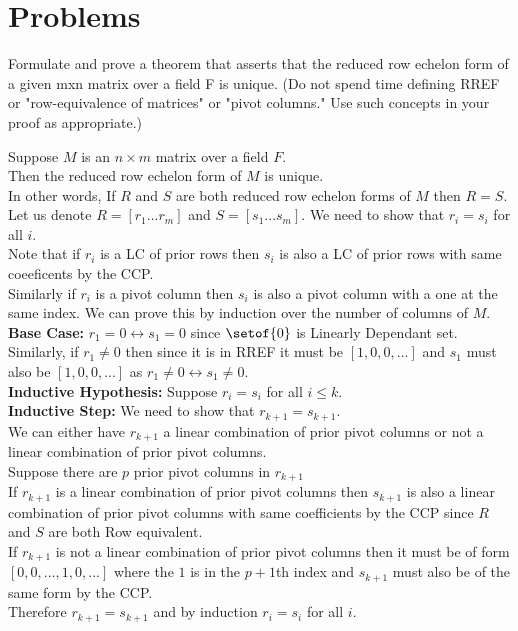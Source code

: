 \documentclass[answers,12pt,addpoints]{exam}
\begin{document}
\section*{Problems}
\begin{questions}
    \question Formulate and prove a theorem that asserts that the reduced row
    echelon form of a given mxn matrix over a field F is unique.  (Do not
    spend time defining RREF or "row-equivalence of matrices" or "pivot
    columns."  Use such concepts in your proof as appropriate.)\\
    \begin{solution}
        Suppose $M$ is an $n \times m$ matrix over a field $F$.\\
        Then the reduced row echelon form of $M$ is unique.\\
        In other words, If $R$ and $S$ are both reduced row echelon forms of $M$ then $R = S$.\\
        Let us denote $R = [r_1 ... r_m]$ and $S = [s_1 ... s_m]$. We need to show that $r_i = s_i$ for all $i$.\\
        Note that if $r_i$ is a LC of prior rows then $s_i$ is also a LC of prior rows with same coeeficents by the CCP.\\
        Similarly if $r_i$ is a pivot column then $s_i$ is also a pivot column with a one at the same index. 
        We can prove this by induction over the number of columns of $M$.\\
        \textbf{Base Case:} $r_1 = 0 \leftrightarrow s_1 = 0$ since $\setof{0}$ is Linearly Dependant set. Similarly, if $r_1 \neq 0$ then since it is in RREF it must be $[1,0,0,...]$ and $s_1$ must also be $[1,0,0,...]$ as $r_1 \neq 0 \leftrightarrow s_1 \neq 0$.\\
        \textbf{Inductive Hypothesis:} Suppose $r_i = s_i$ for all $i \leq k$.\\
        \textbf{Inductive Step:} We need to show that $r_{k+1} = s_{k+1}$.\\
        We can either have $r_{k+1}$ a linear combination of prior pivot columns or not a linear combination of prior pivot columns.\\
        Suppose there are $p$ prior pivot columns in $r_{k+1}$ \\
        If $r_{k+1}$ is a linear combination of prior pivot columns then $s_{k+1}$ is also a linear combination of prior pivot columns with same coefficients by the CCP since $R$ and $S$ are both Row equivalent. \\
        If $r_{k+1}$ is not a linear combination of prior pivot columns then it must be of form $[0,0,...,1,0,...]$ where the $1$ is in the $p+1$th index and $s_{k+1}$ must also be of the same form by the CCP.\\
        Therefore $r_{k+1} = s_{k+1}$ and by induction $r_i = s_i$ for all $i$.
    \end{solution}


\end{questions}
\end{document}

